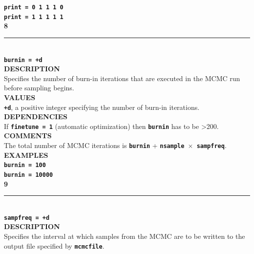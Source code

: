\documentclass[a4paper]{book}
\numberwithin{equation}{section} \renewcommand{\baselinestretch}{0.55}
\begin{document}
\textbf{\texttt{print = 0 1 1 1 0}} \vspace{5pt}\\
\textbf{\texttt{print = 1 1 1 1 1}} \vspace{10pt}\\
\textbf{{\large 8}} \\
\noindent\rule{\textwidth}{0.8pt} \\
\textbf{{\Large \texttt{burnin = +d}}} \vspace{5pt}\\
\textbf{DESCRIPTION} \vspace{5pt}\\
Specifies the number of burn-in iterations that are executed in the
MCMC run before sampling begins.
\vspace{5pt}\\
\textbf{VALUES} \vspace{5pt}\\
\textbf{\texttt{+d}}, a positive integer specifying the number of burn-in iterations. \vspace{5pt}\\
\textbf{DEPENDENCIES} \vspace{5pt}\\
If \textbf{\texttt{finetune = 1}} (automatic optimization) then \textbf{\texttt{burnin}} has to be >200. \vspace{5pt}\\
\textbf{COMMENTS} \vspace{5pt}\\
The total number of MCMC iterations is \textbf{\texttt{burnin}} + \textbf{\texttt{nsample $\times$ sampfreq}}. \vspace{5pt}\\
\textbf{EXAMPLES} \vspace{5pt}\\
\textbf{\texttt{burnin = 100}} \vspace{5pt}\\
\textbf{\texttt{burnin = 10000}}\vspace{10pt}\\
\textbf{{\large 9}} \\
\noindent\rule{\textwidth}{0.8pt} \\
\textbf{{\Large \texttt{sampfreq = +d}}} \vspace{5pt}\\
\textbf{DESCRIPTION} \vspace{5pt}\\
Specifies the interval at which samples from the MCMC are to be written to the output file specified by \textbf{\texttt{mcmcfile}}. \vspace{5pt}\\
\end{document}
